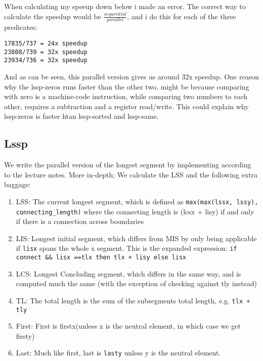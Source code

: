 \documentclass[11pt]{article}
\begin{document}
When calculating my speeup down below i made an error. The correct way to calculate the speedup would be
\(\frac{sequential}{parallel}\), and i do this for each of the three predicates:
\begin{verbatim}
17835/737 = 24x speedup
23808/739 = 32x speedup
23934/736 = 32x speedup
\end{verbatim}
And as can be seen, this parallel version gives us around 32x speedup. One reason why the lssp-zeros
runs faster than the other two, might be because comparing with zero is a machine-code instruction, 
while comparing two numbers to each other, requires a subtraction and a register read/write. This
could explain why lssp-zeros is faster htan lssp-sorted and lssp-same.

\subsection{Lssp}
\label{sec:orgc0f5c4c}
We write the parallel version of the longest segment by implementing according to the lecture notes.  
More in-depth; We calculate the LSS and the following extra baggage:
\begin{enumerate}
\item LSS: The current longest segment, which is defined as \texttt{max(max(lssx, lssy), connecting\_length)}
where the connecting length is (lcsx + lisy) if and only if there is a connection across
boundaries
\item LIS: Longest initial segment, which differs from MIS by only being applicable if \texttt{lisx} spans the
whole x segment. This is the expanded expression: \texttt{if connect \&\& lisx ==tlx then tlx + lisy else lisx}
\item LCS: Longest Concluding segment, which differs in the same way, and is computed much the same (with
the exception of checking against tly instead)
\item TL: The total length is the sum of the subsegments total length, e.g. \texttt{tlx + tly}
\item First: First is firstx(unless x is the neutral element, in which case we get firsty)
\item Last: Much like first, last is \texttt{lasty} unless y is the neutral element.
\end{enumerate}
\end{document}
